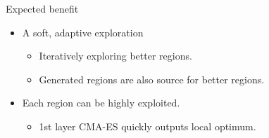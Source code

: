 \begin{frame}{Expected benefit}
  \begin{itemize}
    \item A soft, adaptive exploration
      \begin{itemize}
        \item Iteratively exploring better regions.
        \item Generated regions are also source for better regions.
      \end{itemize}
      \vspace*{14pt}
    \item Each region can be highly exploited. 
      \begin{itemize}
        \item 1st layer CMA-ES quickly outputs local optimum.
      \end{itemize}
  \end{itemize}
\end{frame}




%

